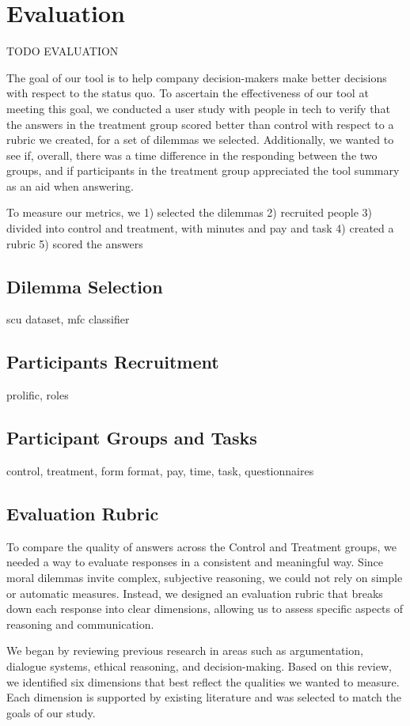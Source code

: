 \section{Evaluation}

TODO EVALUATION

The goal of our tool is to help company decision-makers make better decisions with respect to the status quo.
To ascertain the effectiveness of our tool at meeting this goal, we conducted a user study with people in tech to verify that the answers in the treatment group scored better than control with respect to a rubric we created, for a set of dilemmas we selected.
Additionally, we wanted to see if, overall, there was a time difference in the responding between the two groups, and if participants in the treatment group appreciated the tool summary as an aid when answering.

To measure our metrics, we
1) selected the dilemmas
2) recruited people
3) divided into control and treatment, with minutes and pay and task
4) created a rubric
5) scored the answers

\subsection{Dilemma Selection}
scu dataset, mfc classifier
\subsection{Participants Recruitment}
prolific, roles
\subsection{Participant Groups and Tasks}
control, treatment, form format, pay, time, task, questionnaires
\subsection{Evaluation Rubric}
To compare the quality of answers across the Control and Treatment groups, we needed a way to evaluate responses in a consistent and meaningful way. Since moral dilemmas invite complex, subjective reasoning, we could not rely on simple or automatic measures. Instead, we designed an evaluation rubric that breaks down each response into clear dimensions, allowing us to assess specific aspects of reasoning and communication.

We began by reviewing previous research in areas such as argumentation, dialogue systems, ethical reasoning, and decision-making. Based on this review, we identified six dimensions that best reflect the qualities we wanted to measure. Each dimension is supported by existing literature and was selected to match the goals of our study.

